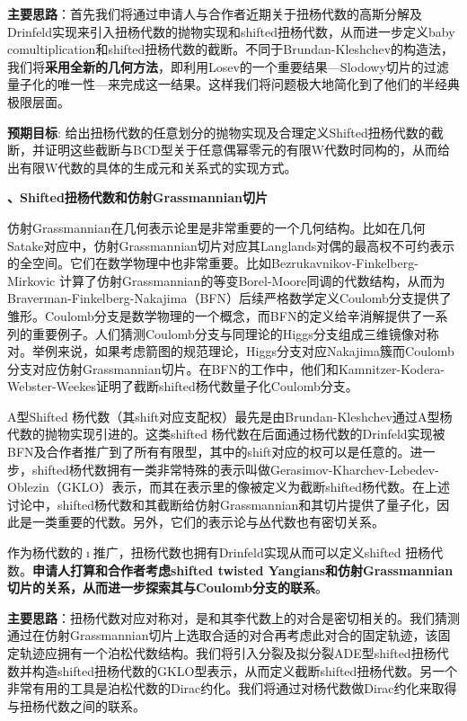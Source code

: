 \documentclass[12pt,UTF8,AutoFakeBold=4,a4paper]{ctexart}
\begin{document}
\textbf{主要思路}：首先我们将通过申请人与合作者近期关于扭杨代数的高斯分解及Drinfeld实现来引入扭杨代数的抛物实现和shifted扭杨代数，从而进一步定义baby comultiplication和shifted扭杨代数的截断。不同于Brundan-Kleshchev的构造法，我们将\textbf{采用全新的几何方法}，即利用Losev的一个重要结果---Slodowy切片的过滤量子化的唯一性---来完成这一结果。这样我们将问题极大地简化到了他们的半经典极限层面。

\textbf{预期目标}: 给出扭杨代数的任意划分的抛物实现及合理定义Shifted扭杨代数的截断，并证明这些截断与BCD型关于任意偶幂零元的有限W代数时同构的，从而给出有限W代数的具体的生成元和关系式的实现方式。

\medskip

\textbf{、Shifted扭杨代数和仿射Grassmannian切片}

仿射Grassmannian在几何表示论里是非常重要的一个几何结构。比如在几何Satake对应中，仿射Grassmannian切片对应其Langlands对偶的最高权不可约表示的全空间。它们在数学物理中也非常重要。比如Bezrukavnikov-Finkelberg-Mirkovic 计算了仿射Grassmannian的等变Borel-Moore同调的代数结构，从而为Braverman-Finkelberg-Nakajima（BFN）后续严格数学定义Coulomb分支提供了雏形。Coulomb分支是数学物理的一个概念，而BFN的定义给辛消解提供了一系列的重要例子。人们猜测Coulomb分支与同理论的Higgs分支组成三维镜像对称对。举例来说，如果考虑箭图的规范理论，Higgs分支对应Nakajima簇而Coulomb分支对应仿射Grassmannian切片。在BFN的工作中，他们和Kamnitzer-Kodera-Webster-Weekes证明了截断shifted杨代数量子化Coulomb分支。

A型Shifted 杨代数（其shift对应支配权）最先是由Brundan-Kleshchev通过A型杨代数的抛物实现引进的。这类shifted 杨代数在后面通过杨代数的Drinfeld实现被BFN及合作者推广到了所有有限型，其中的shift对应的权可以是任意的。进一步，shifted杨代数拥有一类非常特殊的表示叫做Gerasimov-Kharchev-Lebedev-Oblezin（GKLO）表示，而其在表示里的像被定义为截断shifted杨代数。在上述讨论中，shifted杨代数和其截断给仿射Grassmannian和其切片提供了量子化，因此是一类重要的代数。另外，它们的表示论与丛代数也有密切关系。

作为杨代数的$\imath$推广，扭杨代数也拥有Drinfeld实现从而可以定义shifted 扭杨代数。\textbf{申请人打算和合作者考虑shifted twisted Yangians和仿射Grassmannian切片的关系，从而进一步探索其与Coulomb分支的联系}。

\textbf{主要思路}：扭杨代数对应对称对，是和其李代数上的对合是密切相关的。我们猜测通过在仿射Grassmannian切片上选取合适的对合再考虑此对合的固定轨迹，该固定轨迹应拥有一个泊松代数结构。我们将引入分裂及拟分裂ADE型shifted扭杨代数并构造shifted扭杨代数的GKLO型表示，从而定义截断shifted扭杨代数。另一个非常有用的工具是泊松代数的Dirac约化。我们将通过对杨代数做Dirac约化来取得与扭杨代数之间的联系。
\end{document}
